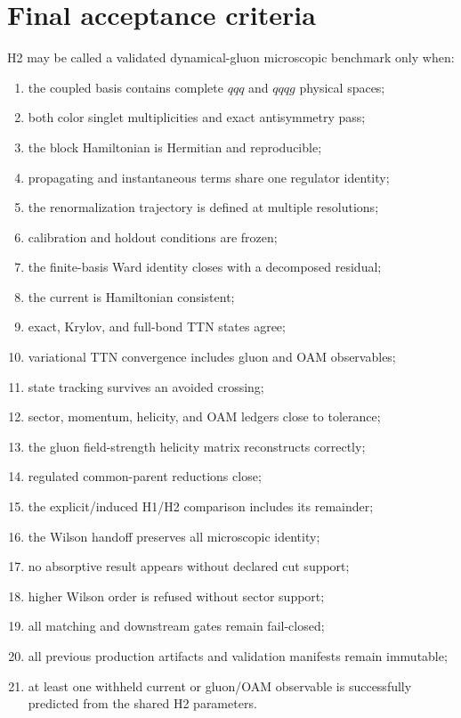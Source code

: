 \documentclass[11pt]{article}
\begin{document}
\section{Final acceptance criteria}

H2 may be called a validated dynamical-gluon microscopic benchmark only when:
\begin{enumerate}
 \item the coupled basis contains complete \(qqq\) and \(qqqg\) physical
 spaces;
 \item both color singlet multiplicities and exact antisymmetry pass;
 \item the block Hamiltonian is Hermitian and reproducible;
 \item propagating and instantaneous terms share one regulator identity;
 \item the renormalization trajectory is defined at multiple resolutions;
 \item calibration and holdout conditions are frozen;
 \item the finite-basis Ward identity closes with a decomposed residual;
 \item the current is Hamiltonian consistent;
 \item exact, Krylov, and full-bond TTN states agree;
 \item variational TTN convergence includes gluon and OAM observables;
 \item state tracking survives an avoided crossing;
 \item sector, momentum, helicity, and OAM ledgers close to tolerance;
 \item the gluon field-strength helicity matrix reconstructs correctly;
 \item regulated common-parent reductions close;
 \item the explicit/induced H1/H2 comparison includes its remainder;
 \item the Wilson handoff preserves all microscopic identity;
 \item no absorptive result appears without declared cut support;
 \item higher Wilson order is refused without sector support;
 \item all matching and downstream gates remain fail-closed;
 \item all previous production artifacts and validation manifests remain
 immutable;
 \item at least one withheld current or gluon/OAM observable is successfully
 predicted from the shared H2 parameters.
\end{enumerate}
\end{document}
